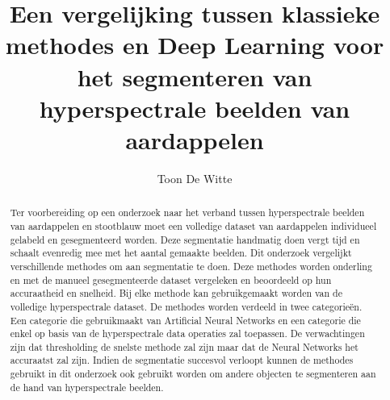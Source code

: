 \documentclass{hogent-article}
\title{Een vergelijking tussen klassieke methodes en Deep Learning voor het segmenteren van hyperspectrale beelden van aardappelen}
\author{Toon De Witte}
\begin{document}
\begin{abstract}

Ter voorbereiding op een onderzoek naar het verband tussen hyperspectrale beelden van aardappelen en stootblauw moet een volledige dataset van aardappelen individueel gelabeld en gesegmenteerd worden. Deze segmentatie handmatig doen vergt tijd en schaalt evenredig mee met het aantal gemaakte beelden. Dit onderzoek vergelijkt verschillende methodes om aan segmentatie te doen. Deze methodes worden onderling en met de manueel gesegmenteerde dataset vergeleken en beoordeeld op hun accuraatheid en snelheid. Bij elke methode kan gebruikgemaakt worden van de volledige hyperspectrale dataset. De methodes worden verdeeld in twee categorieën. Een categorie die gebruikmaakt van Artificial Neural Networks en een categorie die enkel op basis van de hyperspectrale data operaties zal toepassen. De verwachtingen zijn dat thresholding de snelste methode zal zijn maar dat de Neural Networks het accuraatst zal zijn. Indien de segmentatie succesvol verloopt kunnen de methodes gebruikt in dit onderzoek ook gebruikt worden om andere objecten te segmenteren aan de hand van hyperspectrale beelden.
\end{abstract}

\tableofcontents



\printbibliography[heading=bibintoc]
\end{document}
